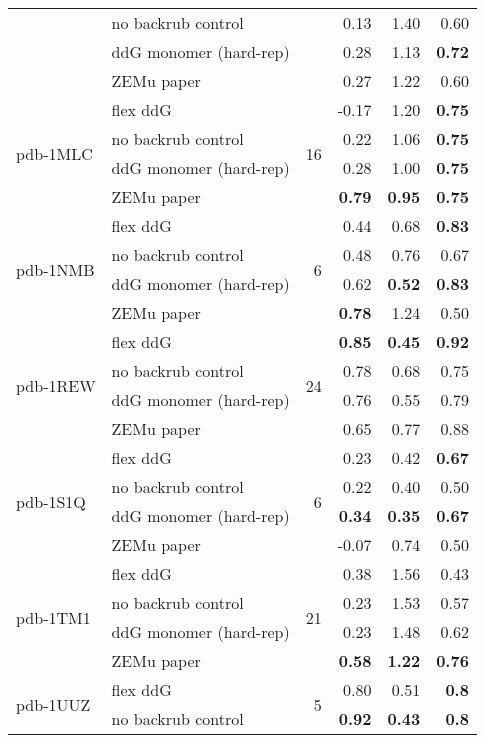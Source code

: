 \begin{table}
\begin{tabular}{llrrrr}
 & no backrub control & & 0.13 & 1.40 & 0.60  \\
 & ddG monomer (hard-rep) & & 0.28 & 1.13 & \textbf{0.72}  \\
 & ZEMu paper & & 0.27 & 1.22 & 0.60  \\
\hline
 \multirow{ 4}{*}{pdb-1MLC} & flex ddG & \multirow{ 4}{*}{16} & -0.17 & 1.20 & \textbf{0.75}  \\
 & no backrub control & & 0.22 & 1.06 & \textbf{0.75}  \\
 & ddG monomer (hard-rep) & & 0.28 & 1.00 & \textbf{0.75}  \\
 & ZEMu paper & & \textbf{0.79} & \textbf{0.95} & \textbf{0.75}  \\
\hline
 \multirow{ 4}{*}{pdb-1NMB} & flex ddG & \multirow{ 4}{*}{6} & 0.44 & 0.68 & \textbf{0.83}  \\
 & no backrub control & & 0.48 & 0.76 & 0.67  \\
 & ddG monomer (hard-rep) & & 0.62 & \textbf{0.52} & \textbf{0.83}  \\
 & ZEMu paper & & \textbf{0.78} & 1.24 & 0.50  \\
\hline
 \multirow{ 4}{*}{pdb-1REW} & flex ddG & \multirow{ 4}{*}{24} & \textbf{0.85} & \textbf{0.45} & \textbf{0.92}  \\
 & no backrub control & & 0.78 & 0.68 & 0.75  \\
 & ddG monomer (hard-rep) & & 0.76 & 0.55 & 0.79  \\
 & ZEMu paper & & 0.65 & 0.77 & 0.88  \\
\hline
 \multirow{ 4}{*}{pdb-1S1Q} & flex ddG & \multirow{ 4}{*}{6} & 0.23 & 0.42 & \textbf{0.67}  \\
 & no backrub control & & 0.22 & 0.40 & 0.50  \\
 & ddG monomer (hard-rep) & & \textbf{0.34} & \textbf{0.35} & \textbf{0.67}  \\
 & ZEMu paper & & -0.07 & 0.74 & 0.50  \\
\hline
 \multirow{ 4}{*}{pdb-1TM1} & flex ddG & \multirow{ 4}{*}{21} & 0.38 & 1.56 & 0.43  \\
 & no backrub control & & 0.23 & 1.53 & 0.57  \\
 & ddG monomer (hard-rep) & & 0.23 & 1.48 & 0.62  \\
 & ZEMu paper & & \textbf{0.58} & \textbf{1.22} & \textbf{0.76}  \\
\hline
 \multirow{ 4}{*}{pdb-1UUZ} & flex ddG & \multirow{ 4}{*}{5} & 0.80 & 0.51 & \textbf{0.8}  \\
 & no backrub control & & \textbf{0.92} & \textbf{0.43} & \textbf{0.8}  \\

\end{tabular}
\end{table}
